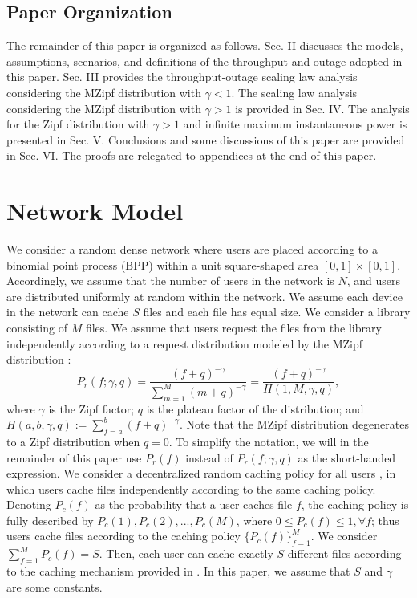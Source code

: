 \documentclass[journal,draftclsnofoot,onecolumn,12pt,twoside]{IEEEtran}
\begin{document}
\subsection{Paper Organization}

The remainder of this paper is organized as follows. Sec. II discusses the models, assumptions, scenarios, and definitions of the throughput and outage adopted in this paper. Sec. III provides the throughput-outage scaling law analysis considering the MZipf distribution with $\gamma<1$. The scaling law analysis considering the MZipf distribution with $\gamma>1$ is provided in Sec. IV. The analysis for the Zipf distribution with $\gamma>1$ and infinite maximum instantaneous power is presented in Sec. V. Conclusions and some discussions of this paper are provided in Sec. VI. The proofs are relegated to appendices at the end of this paper.

\section{Network Model}

\label{Sec:Net_Setup}

We consider a random dense network where users are placed according to a binomial point process (BPP) within a unit square-shaped area $[0,1]\times [0,1]$. Accordingly, we assume that the number of users in the network is $N$, and users are distributed uniformly at random within the network. We assume each device in the network can cache $S$ files and each file has equal size. We consider a library consisting of $M$ files. We assume that users request the files from the library independently according to a request distribution modeled by the MZipf distribution \cite{lee2019throughput}:
\begin{equation}
P_r(f;\gamma,q)=\frac{(f+q)^{-\gamma}}{\sum_{m=1}^M (m+q)^{-\gamma}}=\frac{(f+q)^{-\gamma}}{H(1,M,\gamma,q)},
\end{equation}
where $\gamma$ is the Zipf factor; $q$ is the plateau factor of the distribution; and $H(a,b,\gamma,q):=\sum_{f=a}^b (f+q)^{-\gamma}$. Note that the MZipf distribution degenerates to a Zipf distribution when $q=0$. To simplify the notation, we will in the remainder of this paper use $P_r(f)$ instead of $P_r(f;\gamma,q)$ as the short-handed expression. We consider a decentralized random caching policy for all users \cite{Blaszczyszyn:fcache}, in which users cache files independently according to the same caching policy. Denoting $P_c(f)$ as the probability that a user caches file $f$, the caching policy is fully described by $P_c(1),P_c(2),...,P_c(M)$, where $0\leq P_c(f)\leq 1,\forall f$; thus users cache files according to the caching policy $\lbrace P_c(f) \rbrace_{f=1}^M$. We consider $\sum_{f=1}^M P_c(f)=S$. Then, each user can cache exactly $S$ different files according to the caching mechanism provided in \cite{Blaszczyszyn:fcache}. In this paper, we assume that $S$ and $\gamma$ are some constants.
\end{document}

